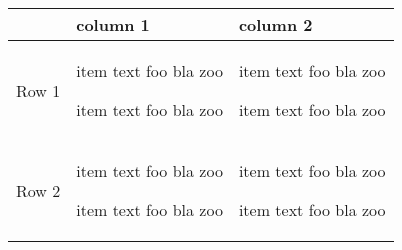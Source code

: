\documentclass{article}
\begin{document}
\begin{table}
\centering
\begin{tabularx}{\textwidth}{|p{15mm}|p{30mm}|X@{}|}
\hline
  & column 1 &  column 2 \\ \hline 
Row 1
&
\begin{tabitemize}
\item item text foo bla zoo
\item item text foo bla zoo
\end{tabitemize}
&
\begin{tabitemize}
\item item text foo bla zoo
\item item text foo bla zoo
\end{tabitemize} \\ \hline
Row 2
&
\begin{tabitemize}
\item item text foo bla zoo
\item item text foo bla zoo
\end{tabitemize}
&
\begin{tabitemize}
\item item text foo bla zoo
\item item text foo bla zoo
\end{tabitemize} \\ \hline
\end{tabularx}
\end{table}
\end{document}
